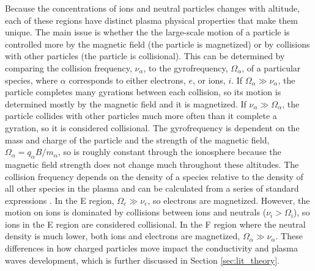 Because the concentrations of ions and neutral particles changes with altitude, each of these regions have distinct plasma physical properties that make them unique.  The main issue is whether the the large-scale motion of a particle is controlled more by the magnetic field (the particle is magnetized) or by collisions with other particles (the particle is collisional).  This can be determined by comparing the collision frequency, \(\nu_\alpha\), to the gyrofrequency, \(\Omega_\alpha\), of a particular species, where \(\alpha\) corresponds to either electrons, \(e\), or ions, \(i\).  If \(\Omega_\alpha \gg \nu_\alpha\), the particle completes many gyrations between each collision, so its motion is determined mostly by the magnetic field and it is magnetized.  If \(\nu_\alpha \gg \Omega_\alpha\), the particle collides with other particles much more often than it complete a gyration, so it is considered collisional.  The gyrofrequency is dependent on the mass and charge of the particle and the strength of the magnetic field, \(\Omega_\alpha = q_\alpha B/m_\alpha\), so is roughly constant through the ionosphere because the magnetic field strength does not change much throughout these altitudes.  The collision frequency depends on the density of a species relative to the density of all other species in the plasma and can be calculated from a series of standard expressions \citep{Schunk1980,Schunk2009}.  In the E region, \(\Omega_e \gg \nu_e\), so electrons are magnetized.  However, the motion on ions is dominated by collisions between ions and neutrals (\(\nu_i > \Omega_i\)), so ions in the E region are considered collisional.  In the F region where the neutral density is much lower, both ions and electrons are magnetized, \(\Omega_\alpha \gg \nu_\alpha\).  These differences in how charged particles move impact the conductivity and plasma waves development, which is further discussed in Section \ref{sec:lit_theory}.

